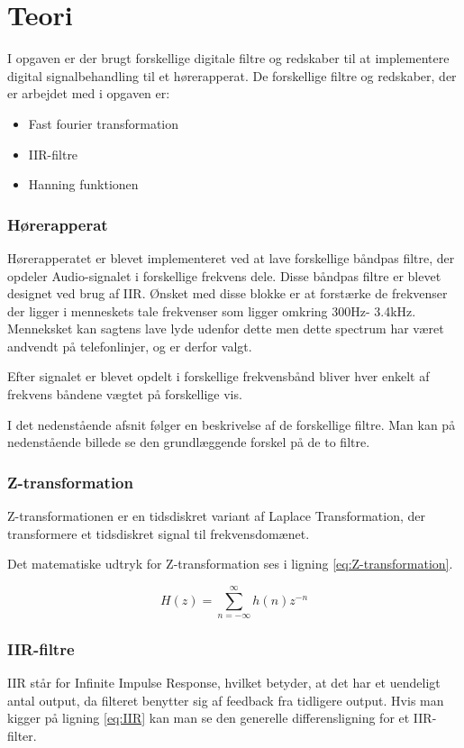 \chapter{Teori}\label{ch:Teori}

I opgaven er der brugt forskellige digitale filtre og redskaber til at implementere digital signalbehandling til et hørerapperat. De forskellige filtre og redskaber, der er arbejdet med i opgaven er:
\begin{itemize}
\item Fast fourier transformation
\item IIR-filtre
\item Hanning funktionen
\end{itemize}

\subsection{Hørerapperat}
Hørerapperatet er blevet implementeret ved at lave forskellige båndpas filtre, der opdeler Audio-signalet i forskellige frekvens dele. Disse båndpas filtre er blevet designet ved brug af IIR. Ønsket med disse blokke er at forstærke de frekvenser der ligger i menneskets tale frekvenser som ligger omkring 300Hz- 3.4kHz. Menneksket kan sagtens lave lyde udenfor dette men dette spectrum har været andvendt på telefonlinjer, og er derfor valgt. 


Efter signalet er blevet opdelt i forskellige frekvensbånd bliver hver enkelt af frekvens båndene vægtet på forskellige vis.

I det nedenstående afsnit følger en beskrivelse af de forskellige filtre. Man kan på nedenstående billede  se den grundlæggende forskel på de to filtre.


\subsection{Z-transformation}
Z-transformationen er en tidsdiskret variant af Laplace Transformation, der transformere et tidsdiskret signal til frekvensdomænet.

Det matematiske udtryk for Z-transformation ses i ligning \ref{eq:Z-transformation}.

\begin{equation}\label{eq:Z-transformation}
{H(z)} = \displaystyle\sum_{n=-\infty }^{\infty} {h(n)z^{-n}}
\end{equation}
 

\subsection{IIR-filtre}
IIR står for Infinite Impulse Response, hvilket betyder, at det har et uendeligt antal output, da filteret benytter sig af feedback fra tidligere output. Hvis man kigger på ligning \eqref{eq:IIR} kan man se den generelle differensligning for et IIR-filter.


